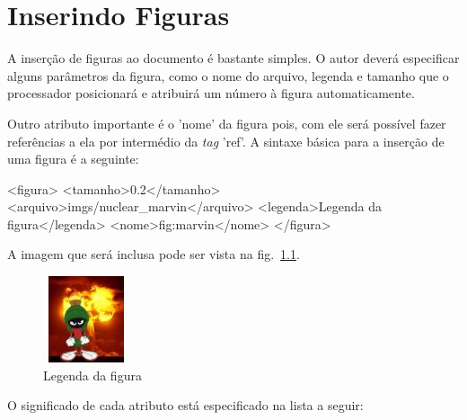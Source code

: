 \newpage \chapter{Inserindo Figuras}\setcounter{SteP}{1}
\label{sec:figuras}

A inserção de figuras ao documento é bastante simples. O autor deverá
especificar alguns parâmetros da figura, como o nome do arquivo, legenda e
tamanho que o processador posicionará e atribuirá um número à figura
automaticamente. 

Outro atributo importante é o 'nome' da figura pois, com ele será
possível fazer referências a ela por intermédio da {\it tag} 'ref'. A sintaxe
básica para a inserção de uma figura é a seguinte:

\begin{BoxVerbatim}
    <figura>
        <tamanho>0.2</tamanho>
        <arquivo>imgs/nuclear_marvin</arquivo>
        <legenda>Legenda da figura</legenda>
        <nome>fig:marvin</nome>
    </figura>
\end{BoxVerbatim}

A imagem que será inclusa pode ser vista na fig.~\ref{fig:marvin}.

\begin{figure}[H]\begin{center}
    \includegraphics[width=0.2\columnwidth]
    {imgs/nuclear_marvin}
    \caption{Legenda da figura}
    \label{fig:marvin}
\end{center}\end{figure}


O significado de cada atributo está especificado na lista a seguir:

